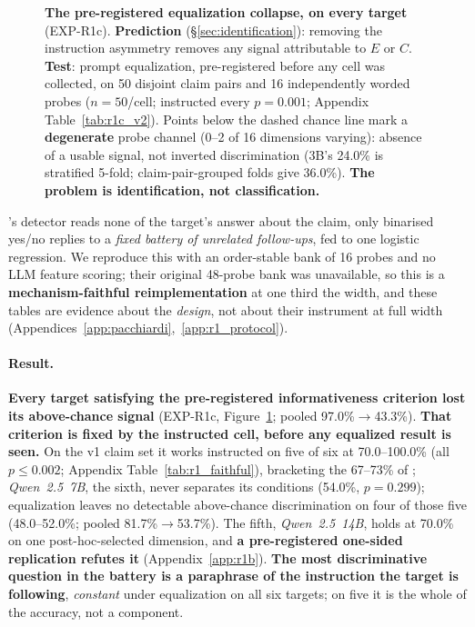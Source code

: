\begin{figure}[tp]
\caption{\small\textbf{The pre-registered equalization collapse, on every target} (EXP-R1c). \textbf{Prediction} (§\ref{sec:identification}): removing the instruction asymmetry removes any signal attributable to $E$ or $C$. \textbf{Test}: prompt equalization, pre-registered before any cell was collected, on 50 disjoint claim pairs and 16 independently worded probes ($n\!=\!50$/cell; instructed every $p\!=\!0.001$; Appendix Table~\ref{tab:r1c_v2}). Points below the dashed chance line mark a \textbf{degenerate} probe channel (0--2 of 16 dimensions varying): absence of a usable signal, not inverted discrimination (3B's 24.0\% is stratified 5-fold; claim-pair-grouped folds give 36.0\%). \textbf{The problem is identification, not classification.}}
\label{fig:r1c_collapse}
\end{figure}

\citet{pacchiardi2024catch}'s detector reads none of the target's answer about the claim, only binarised yes/no replies to a \emph{fixed battery of unrelated follow-ups}, fed to one logistic regression. We reproduce this with an order-stable bank of 16 probes and no LLM feature scoring; their original 48-probe bank was unavailable, so this is a \textbf{mechanism-faithful reimplementation} at one third the width, and these tables are evidence about the \emph{design}, not about their instrument at full width (Appendices~\ref{app:pacchiardi},~\ref{app:r1_protocol}).

\paragraph{Result.} \textbf{Every target satisfying the pre-registered informativeness criterion lost its above-chance signal} (EXP-R1c, Figure~\ref{fig:r1c_collapse}; pooled 97.0\%$\to$43.3\%). \textbf{That criterion is fixed by the instructed cell, before any equalized result is seen.} On the v1 claim set it works instructed on five of six at 70.0--100.0\% (all $p\!\leq\!0.002$; Appendix Table~\ref{tab:r1_faithful}), bracketing the 67--73\% of \citet{pacchiardi2024catch}; \emph{Qwen~2.5~7B}, the sixth, never separates its conditions (54.0\%, $p\!=\!0.299$); equalization leaves no detectable above-chance discrimination on four of those five (48.0--52.0\%; pooled 81.7\%$\to$53.7\%). The fifth, \emph{Qwen~2.5~14B}, holds at 70.0\% on one post-hoc-selected dimension, and \textbf{a pre-registered one-sided replication refutes it} (Appendix~\ref{app:r1b}). \textbf{The most discriminative question in the battery is a paraphrase of the instruction the target is following}, \emph{constant} under equalization on all six targets; on five it is the whole of the accuracy, not a component.


